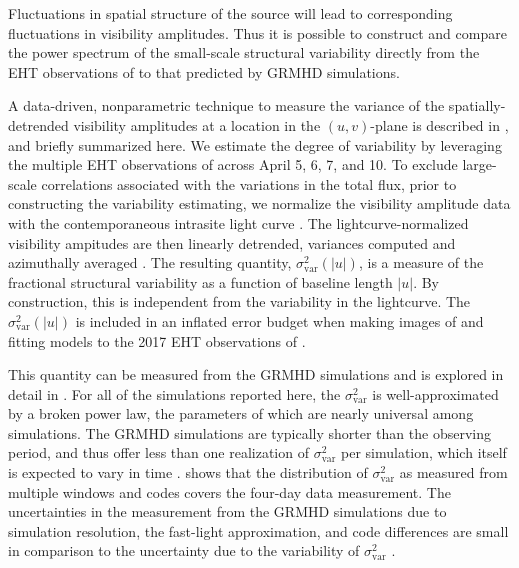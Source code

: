 Fluctuations in spatial structure of the source will lead to corresponding fluctuations in visibility amplitudes. Thus it is possible to construct and compare the power spectrum of the small-scale structural variability directly from the EHT observations of \sgra to that predicted by GRMHD simulations.

A data-driven, nonparametric technique to measure the variance of the spatially-detrended visibility amplitudes at a location in the $(u,v)$-plane is described in \citet{NoiseModeling}, and briefly summarized here.  We estimate the degree of variability by leveraging the multiple EHT observations of \sgra across April 5, 6, 7, and 10.  To exclude large-scale correlations associated with the variations in the total flux, prior to constructing the variability estimating, we normalize the visibility amplitude data with the contemporaneous intrasite light curve \citep{Georgiev_2022}.  The lightcurve-normalized visibility ampitudes are then linearly detrended, variances computed and azimuthally averaged \citep{NoiseModeling,}.  The resulting quantity, $\sigma_\text{var}^2 (|u|)$, is a measure of the fractional structural variability as a function of baseline length $|u|$.  By construction, this is independent from the variability in the lightcurve.  The $\sigma_\text{var}^2 (|u|)$ is included in an inflated error budget when making images of and fitting models to the 2017 EHT observations of \sgra {}.

This quantity can be measured from the GRMHD simulations and is explored in detail in \citet{Georgiev_2022}. For all of the simulations reported here, the $\sigma_\text{var}^2$ is well-approximated by a broken power law, the parameters of which are nearly universal among simulations. The GRMHD simulations are typically shorter than the observing period, and thus offer less than one realization of $\sigma_\text{var}^2$ per simulation, which itself is expected to vary in time . \citet{Georgiev_2022} shows that the distribution of $\sigma_\text{var}^2$ as measured from multiple windows and codes covers the four-day data measurement. 
The uncertainties in the measurement from the GRMHD simulations due to simulation resolution, the fast-light approximation, and code differences are small in comparison to the uncertainty due to the variability of $\sigma_\text{var}^2$ \citep{Georgiev_2022}.

